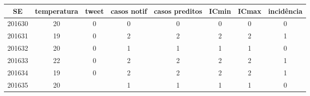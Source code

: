 \begin{tabular}{c|ccccccc}
  \hline
SE & temperatura & tweet & casos notif & casos preditos & ICmin & ICmax & incidência \\ 
  \hline
201630 & 20 & 0 & 0 & 0 & 0 & 0 & 0 \\ 
  201631 & 19 & 0 & 2 & 2 & 2 & 2 & 1 \\ 
  201632 & 20 & 0 & 1 & 1 & 1 & 1 & 0 \\ 
  201633 & 22 & 0 & 2 & 2 & 2 & 2 & 1 \\ 
  201634 & 19 & 0 & 2 & 2 & 2 & 2 & 1 \\ 
  201635 & 20 &  & 1 & 1 & 1 & 1 & 0 \\ 
   \hline
\end{tabular}
